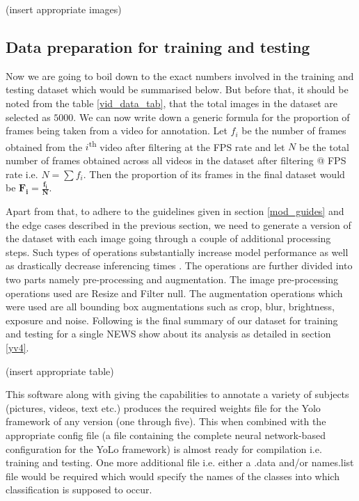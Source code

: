 (insert appropriate images)

\subsection{Data preparation for training and testing} \label{train_test}
Now we are going to boil down to the exact numbers involved in the training and testing dataset which would be summarised below. But before that, it should be noted from the table \ref{vid_data_tab}, that the total images in the dataset are selected as $5000$. We can now write down a generic formula for the proportion of frames being taken from a video for annotation. Let $f_i$ be the number of frames obtained from the $i$\textsuperscript{th} video after filtering at the FPS rate and let $N$ be the total number of frames obtained across all videos in the dataset after filtering @ FPS rate i.e. $N = \sum f_{i}$. Then the proportion of its frames in the final dataset would be $\boldsymbol{F_{i} = \frac{f_{i}}{N}}$. \par

Apart from that, to adhere to the guidelines given in section \ref{mod_guides} and the edge cases described in the previous section, we need to generate a version of the dataset with each image going through a couple of additional processing steps. Such types of operations substantially increase model performance as well as drastically decrease inferencing times \cite{Joseph2021} \cite{Dwyer2020}. The operations are further divided into two parts namely pre-processing and augmentation.  The image pre-processing operations used are Resize and Filter null. The augmentation operations which were used are all bounding box augmentations such as crop, blur, brightness, exposure and noise. Following is the final summary of our dataset for training and testing for a single NEWS show about its analysis as detailed in section \ref{yv4}.

(insert appropriate table)

This software along with giving the capabilities to annotate a variety of subjects (pictures, videos, text etc.) produces the required weights file for the Yolo framework of any version (one through five). This when combined with the appropriate config file (a file containing the complete neural network-based configuration for the YoLo framework) is almost ready for compilation i.e. training and testing. One more additional file i.e. either a .data and/or names.list file would be required which would specify the names of the classes into which classification is supposed to occur. \par

